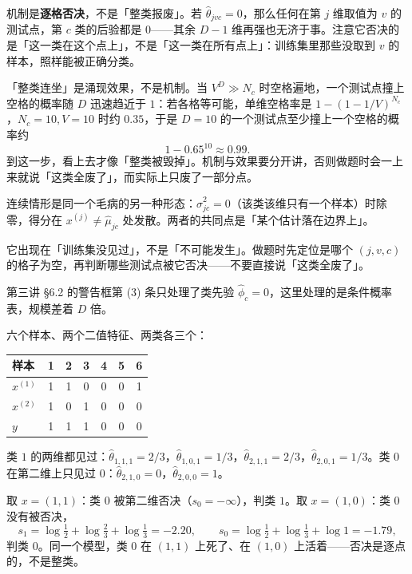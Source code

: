 \documentclass[11pt,a4paper,fontset=windows,zihao=-4]{ctexart}
\newcommand{\tabhead}{\sffamily\bfseries\color{navy}}
\begin{document}
机制是\textbf{逐格否决}，不是「整类报废」。若 $\hat\theta_{jvc}=0$，那么任何在第 $j$ 维取值为 $v$ 的测试点，第 $c$ 类的后验都是 $0$——其余 $D-1$ 维再强也无济于事。注意它否决的是「这一类在这个点上」，不是「这一类在所有点上」：训练集里那些没取到 $v$ 的样本，照样能被正确分类。

「整类连坐」是涌现效果，不是机制。当 $V^D\gg N_c$ 时空格遍地，一个测试点撞上空格的概率随 $D$ 迅速趋近于 $1$：若各格等可能，单维空格率是 $1-(1-1/V)^{N_c}$，$N_c=10,V=10$ 时约 $0.35$，于是 $D=10$ 的一个测试点至少撞上一个空格的概率约
\[
  1-0.65^{10}\approx0.99 .
\]
到这一步，看上去才像「整类被毁掉」。机制与效果要分开讲，否则做题时会一上来就说「这类全废了」，而实际上只废了一部分点。

连续情形是同一个毛病的另一种形态：$\hat\sigma_{jc}^2=0$（该类该维只有一个样本）时除零，得分在 $x^{(j)}\ne\hat\mu_{jc}$ 处发散。两者的共同点是「某个估计落在边界上」。

\begin{warn}[零概率是否决性的]
它出现在「训练集没见过」，不是「不可能发生」。做题时先定位是哪个 $(j,v,c)$ 的格子为空，再判断哪些测试点被它否决——不要直接说「这类全废了」。

第三讲 §6.2 的警告框第 (3) 条只处理了类先验 $\hat\phi_c=0$，这里处理的是条件概率表，规模差着 $D$ 倍。
\end{warn}

\begin{exm}[逐格否决与它的边界]
六个样本、两个二值特征、两类各三个：

\begin{center}
\small
\begin{tabular}{@{}lcccccc@{}}
\toprule
\rowcolor{navy!7}
\tabhead 样本 & 1 & 2 & 3 & 4 & 5 & 6\\
\midrule
$x^{(1)}$ & 1 & 1 & 0 & 0 & 0 & 1\\
$x^{(2)}$ & 1 & 0 & 1 & 0 & 0 & 0\\
$y$ & 1 & 1 & 1 & 0 & 0 & 0\\
\bottomrule
\end{tabular}
\end{center}

类 $1$ 的两维都见过：$\hat\theta_{1,1,1}=2/3$，$\hat\theta_{1,0,1}=1/3$，$\hat\theta_{2,1,1}=2/3$，$\hat\theta_{2,0,1}=1/3$。类 $0$ 在第二维上只见过 $0$：$\hat\theta_{2,1,0}=0$，$\hat\theta_{2,0,0}=1$。

取 $x=(1,1)$：类 $0$ 被第二维否决（$s_0=-\infty$），判类 $1$。取 $x=(1,0)$：类 $0$ 没有被否决，
\[
  s_1=\log\tfrac12+\log\tfrac23+\log\tfrac13=-2.20,\qquad
  s_0=\log\tfrac12+\log\tfrac13+\log1=-1.79,
\]
判类 $0$。同一个模型，类 $0$ 在 $(1,1)$ 上死了、在 $(1,0)$ 上活着——否决是逐点的，不是整类。
\end{exm}
\end{document}

